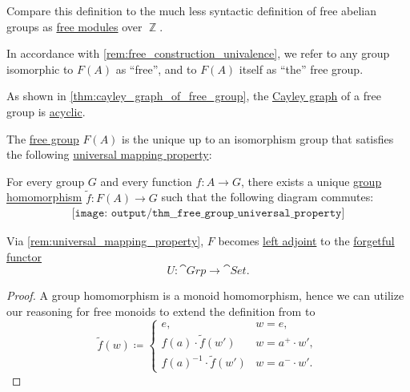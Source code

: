 \begin{comments}
  \item Compare this definition to the much less syntactic definition of free abelian groups as \hyperref[def:free_semimodule]{free modules} over \( \BbbZ \).

  \item In accordance with \cref{rem:free_construction_univalence}, we refer to any group isomorphic to \( F(A) \) as \enquote{free}, and to \(F(A) \) itself as \enquote{the} free group.

  \item As shown in \cref{thm:cayley_graph_of_free_group}, the \hyperref[def:cayley_graph]{Cayley graph} of a free group is \hyperref[def:acyclic_graph]{acyclic}.
\end{comments}

\begin{theorem}\label{thm:free_group_universal_property}
  The \hyperref[def:free_group]{free group} \( F(A) \) is the unique up to an isomorphism group that satisfies the following \hyperref[rem:universal_mapping_property]{universal mapping property}:
  \begin{displayquote}
    For every group \( G \) and every function \( f: A \to G \), there exists a unique \hyperref[def:group/homomorphism]{group homomorphism} \( \widetilde{f}: F(A) \to G \) such that the following diagram commutes:
    \begin{equation}\label{eq:thm:free_group_universal_property/diagram}
      \begin{aligned}
        \texttt{[image: output/thm\_\_free\_group\_universal\_property]}
      \end{aligned}
    \end{equation}
  \end{displayquote}
\end{theorem}
\begin{comments}
  \item Via \cref{rem:universal_mapping_property}, \( F \) becomes \hyperref[def:category_adjunction]{left adjoint} to the \hyperref[def:concrete_category]{forgetful functor}
  \begin{equation*}
    U: \cat{Grp} \to \cat{Set}.
  \end{equation*}
\end{comments}
\begin{proof}
  A group homomorphism is a monoid homomorphism, hence we can utilize our reasoning for free monoids to extend the definition from  to
  \begin{equation*}
    \widetilde{f}(w) \coloneqq \begin{cases}
      e,                      &w = e, \\
      f(a) \cdot \widetilde{f}(w')      &w = a^+ \cdot w', \\
      f(a)^{-1} \cdot \widetilde{f}(w') &w = a^- \cdot w'.
    \end{cases}
  \end{equation*}
\end{proof}

